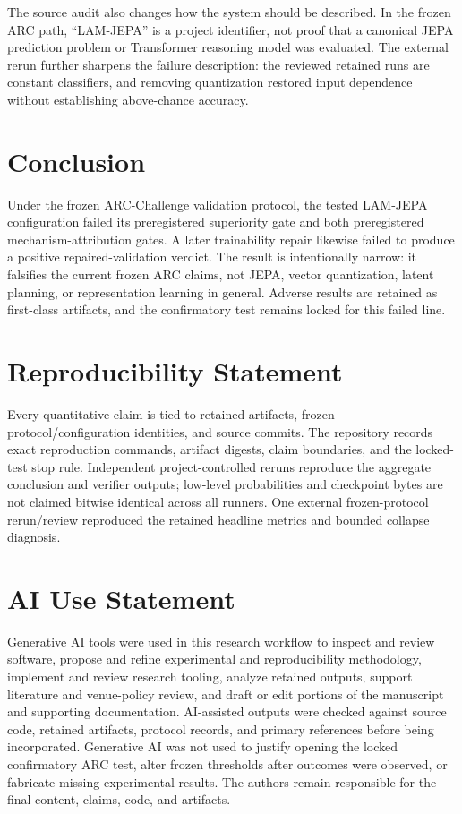 \documentclass{article}
\begin{document}
The source audit also changes how the system should be described. In the frozen ARC path, ``LAM-JEPA'' is a project identifier, not proof that a canonical JEPA prediction problem or Transformer reasoning model was evaluated. The external rerun further sharpens the failure description: the reviewed retained runs are constant classifiers, and removing quantization restored input dependence without establishing above-chance accuracy.

\section{Conclusion}
Under the frozen ARC-Challenge validation protocol, the tested LAM-JEPA configuration failed its preregistered superiority gate and both preregistered mechanism-attribution gates. A later trainability repair likewise failed to produce a positive repaired-validation verdict. The result is intentionally narrow: it falsifies the current frozen ARC claims, not JEPA, vector quantization, latent planning, or representation learning in general. Adverse results are retained as first-class artifacts, and the confirmatory test remains locked for this failed line.

\section*{Reproducibility Statement}
Every quantitative claim is tied to retained artifacts, frozen protocol/configuration identities, and source commits. The repository records exact reproduction commands, artifact digests, claim boundaries, and the locked-test stop rule. Independent project-controlled reruns reproduce the aggregate conclusion and verifier outputs; low-level probabilities and checkpoint bytes are not claimed bitwise identical across all runners. One external frozen-protocol rerun/review reproduced the retained headline metrics and bounded collapse diagnosis.

\section*{AI Use Statement}
Generative AI tools were used in this research workflow to inspect and review software, propose and refine experimental and reproducibility methodology, implement and review research tooling, analyze retained outputs, support literature and venue-policy review, and draft or edit portions of the manuscript and supporting documentation. AI-assisted outputs were checked against source code, retained artifacts, protocol records, and primary references before being incorporated. Generative AI was not used to justify opening the locked confirmatory ARC test, alter frozen thresholds after outcomes were observed, or fabricate missing experimental results. The authors remain responsible for the final content, claims, code, and artifacts.



\end{document}
